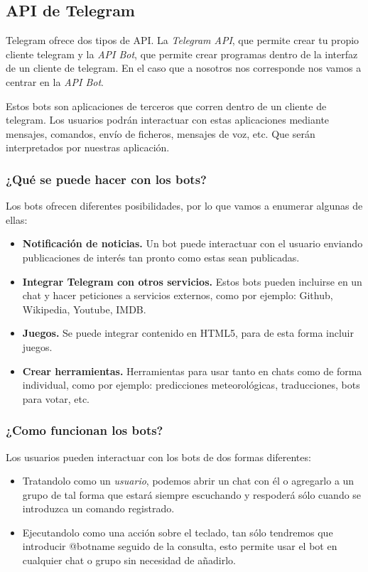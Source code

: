 \documentclass[10pt,journal,compsoc]{IEEEtran}
\begin{document}
\subsection{API de Telegram}
Telegram ofrece dos tipos de API. La \textit{Telegram API}, que permite crear tu propio cliente 
telegram y la \textit{API Bot}, que permite crear programas dentro de la interfaz de un 
cliente de telegram. En el caso que a nosotros nos corresponde nos vamos a 
centrar en la \textit{API Bot}. 

Estos bots son aplicaciones de terceros que corren dentro de un cliente de 
telegram. Los usuarios podrán interactuar con estas aplicaciones mediante 
mensajes, comandos, envío de ficheros, mensajes de voz, etc. Que serán 
interpretados por nuestras aplicación.

\subsubsection{¿Qué se puede hacer con los bots?}
Los bots ofrecen diferentes posibilidades, por lo que vamos a enumerar algunas 
de ellas:
\begin{itemize}
  \item \textbf{Notificación de noticias.} Un bot puede interactuar con el 
  usuario enviando publicaciones de interés tan pronto como estas sean 
  publicadas.
  \item \textbf{Integrar Telegram con otros servicios.} Estos bots pueden 
  incluirse en un chat y hacer peticiones a servicios externos, como por 
  ejemplo: Github, Wikipedia, Youtube, IMDB.
  \item \textbf{Juegos.} Se puede integrar contenido en HTML5, para de esta 
  forma incluir juegos.
  \item \textbf{Crear herramientas.} Herramientas para usar tanto en chats como 
  de forma individual, como por ejemplo: predicciones meteorológicas, 
  traducciones, bots para votar, etc.
\end{itemize}

\subsubsection{¿Como funcionan los bots?}
Los usuarios pueden interactuar con los bots de dos formas diferentes:
\begin{itemize}
  \item Tratandolo como un \textit{usuario}, podemos abrir un chat con él o agregarlo a un grupo de tal
  forma que estará siempre escuchando y respoderá sólo cuando se introduzca un comando registrado.
  \item Ejecutandolo como una acción sobre el teclado, tan sólo tendremos que 
  introducir @botname seguido de la consulta, esto permite usar el bot en 
  cualquier chat o grupo sin necesidad de añadirlo.
\end{itemize}
\end{document}
